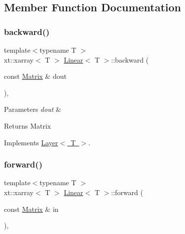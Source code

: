 \subsection{Member Function Documentation}
\mbox{\label{class_linear_a747db1996e723fae7c9713d4b7f303af}} 
\subsubsection{\texorpdfstring{backward()}{backward()}}
{\footnotesize\ttfamily template$<$typename T $>$ \\
xt\+::xarray$<$ T $>$ \mbox{\hyperlink{class_linear}{Linear}}$<$ T $>$\+::backward (\begin{DoxyParamCaption}\item[{const \mbox{\hyperlink{class_layer_a22b1e7286096aa62bd245536c8ebdaf1}{Matrix}} \&}]{dout }\end{DoxyParamCaption})\hspace{0.3cm}{\ttfamily [override]}, {\ttfamily [virtual]}}


\begin{DoxyParams}{Parameters}
{\em dout} & \\
\hline
\end{DoxyParams}
\begin{DoxyReturn}{Returns}
Matrix 
\end{DoxyReturn}


Implements \mbox{\hyperlink{class_layer_ac4c13a3a85bfdd4d7d4d18669e3299fe}{Layer$<$ T $>$}}.

\mbox{\label{class_linear_a901668e9219a8d446b2ac60718b9c9f1}} 
\subsubsection{\texorpdfstring{forward()}{forward()}}
{\footnotesize\ttfamily template$<$typename T $>$ \\
xt\+::xarray$<$ T $>$ \mbox{\hyperlink{class_linear}{Linear}}$<$ T $>$\+::forward (\begin{DoxyParamCaption}\item[{const \mbox{\hyperlink{class_layer_a22b1e7286096aa62bd245536c8ebdaf1}{Matrix}} \&}]{in }\end{DoxyParamCaption})\hspace{0.3cm}{\ttfamily [override]}, {\ttfamily [virtual]}}


